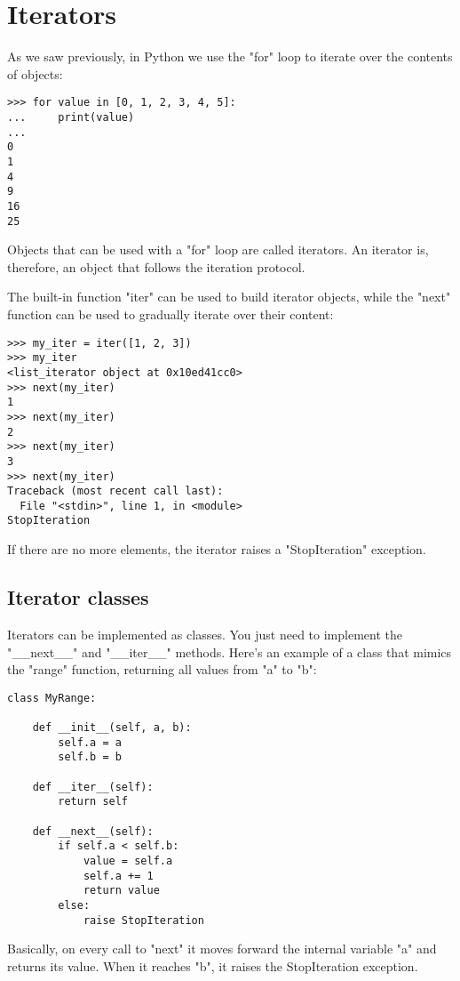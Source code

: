 \chapter{Iterators}\label{iterators}

As we saw previously, in Python we use the "for" loop to iterate over the contents of objects:

\begin{lstlisting}
>>> for value in [0, 1, 2, 3, 4, 5]:
...     print(value)
... 
0
1
4
9
16
25
\end{lstlisting}

Objects that can be used with a "for" loop are called iterators. An iterator is, therefore, an object that follows the iteration protocol.

The built-in function "iter" can be used to build iterator objects, while the "next" function can be used to gradually iterate over their content:

\begin{lstlisting}
>>> my_iter = iter([1, 2, 3])
>>> my_iter
<list_iterator object at 0x10ed41cc0>
>>> next(my_iter)
1
>>> next(my_iter)
2
>>> next(my_iter)
3
>>> next(my_iter)
Traceback (most recent call last):
  File "<stdin>", line 1, in <module>
StopIteration
\end{lstlisting}

If there are no more elements, the iterator raises a "StopIteration" exception.

\section{Iterator classes}

Iterators can be implemented as classes. You just need to implement the "\_\_next\_\_" and "\_\_iter\_\_" methods. Here's an example of a class that mimics the "range" function, returning all values from "a" to "b":

\begin{lstlisting}
class MyRange:

    def __init__(self, a, b):
        self.a = a
        self.b = b

    def __iter__(self):
        return self

    def __next__(self):
        if self.a < self.b:
            value = self.a
            self.a += 1
            return value
        else:
            raise StopIteration
\end{lstlisting}

Basically, on every call to "next" it moves forward the internal variable "a" and returns its value. When it reaches "b", it raises the StopIteration exception.

